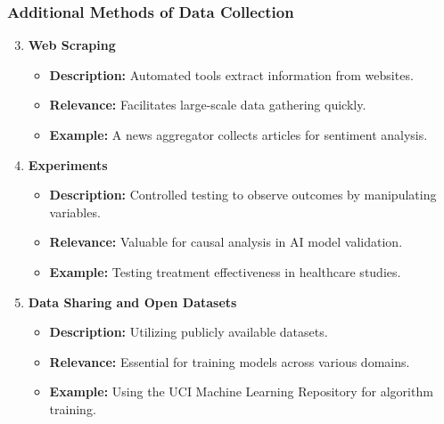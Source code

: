 \documentclass[aspectratio=169]{beamer}
\begin{document}
\begin{frame}[fragile]
    \frametitle{Additional Methods of Data Collection}
    \begin{enumerate}
        \setcounter{enumi}{2} %
        \item \textbf{Web Scraping}
            \begin{itemize}
                \item \textbf{Description:} Automated tools extract information from websites.
                \item \textbf{Relevance:} Facilitates large-scale data gathering quickly.
                \item \textbf{Example:} A news aggregator collects articles for sentiment analysis.
            \end{itemize}

        \item \textbf{Experiments}
            \begin{itemize}
                \item \textbf{Description:} Controlled testing to observe outcomes by manipulating variables.
                \item \textbf{Relevance:} Valuable for causal analysis in AI model validation.
                \item \textbf{Example:} Testing treatment effectiveness in healthcare studies.
            \end{itemize}
        
        \item \textbf{Data Sharing and Open Datasets}
            \begin{itemize}
                \item \textbf{Description:} Utilizing publicly available datasets.
                \item \textbf{Relevance:} Essential for training models across various domains.
                \item \textbf{Example:} Using the UCI Machine Learning Repository for algorithm training.
            \end{itemize}
    \end{enumerate}
\end{frame}
\end{document}
